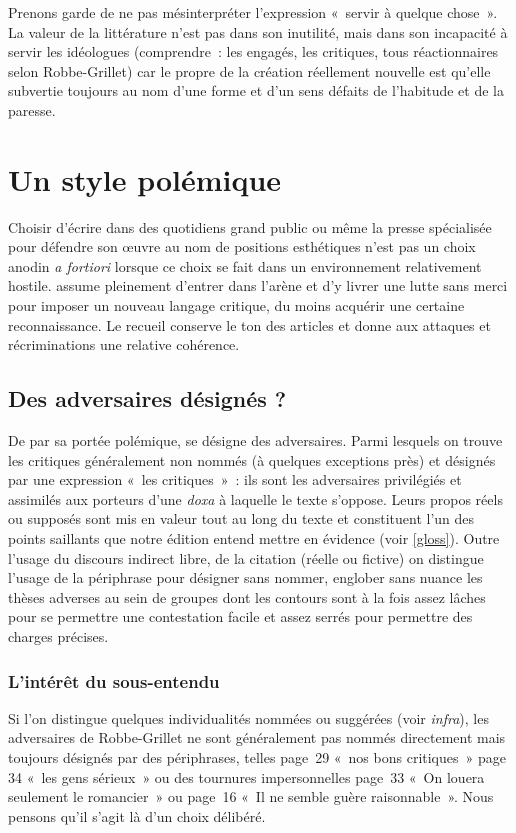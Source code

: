 Prenons garde de ne pas mésinterpréter l'expression «~servir à quelque chose~». La valeur de la littérature n'est pas dans son inutilité, mais dans son incapacité à servir les idéologues  (comprendre~: les engagés, les critiques, tous réactionnaires selon Robbe-Grillet) car le propre de la création réellement nouvelle est qu'elle subvertie toujours au nom d'une forme et d'un sens défaits de l'habitude et de la paresse.


\newpage

\section{Un style polémique}

Choisir d'écrire dans des quotidiens grand public ou même la presse spécialisée pour défendre son œuvre au nom de positions esthétiques n'est pas un choix anodin \textit{a fortiori} lorsque ce choix se fait dans un environnement relativement hostile. \robbe{} assume pleinement d'entrer dans l'arène et d'y livrer une lutte sans merci pour imposer un nouveau langage critique, du moins acquérir une certaine reconnaissance. Le recueil conserve le ton des articles et donne aux attaques et récriminations une relative cohérence.

\subsection{Des adversaires désignés ?}


De par sa portée polémique, \punr{} se désigne des adversaires. Parmi lesquels on trouve les critiques généralement non nommés (à quelques exceptions près) et désignés par une expression «~les critiques~»~: ils sont les adversaires privilégiés et assimilés aux porteurs d'une \textit{doxa} à laquelle le texte s'oppose. Leurs propos réels ou supposés sont mis en valeur tout au long du texte et constituent l'un des points saillants que notre édition entend mettre en évidence (voir \ref{gloss}). Outre l'usage du discours indirect libre, de la citation (réelle ou fictive) on distingue l'usage de la périphrase pour désigner sans nommer, englober sans nuance les thèses adverses au sein de groupes dont les contours sont à la fois assez lâches pour se permettre une contestation facile et assez serrés pour permettre des charges précises.


\subsubsection{L'intérêt du sous-entendu}
Si l'on distingue quelques individualités nommées ou suggérées (voir \textit{infra}), les adversaires de Robbe-Grillet ne sont généralement pas nommés directement mais toujours désignés par des périphrases, telles page~29 «~nos bons critiques~» page 34 «~les gens sérieux~» ou des tournures impersonnelles page~33 «~On louera seulement le romancier~» ou page~16 «~Il ne semble guère raisonnable~». Nous pensons qu'il s'agit là d'un choix délibéré.

